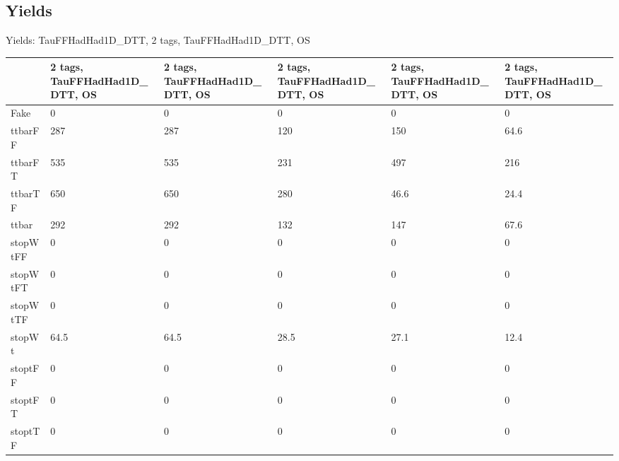 
\subsection{Yields}

\begin{frame}{Yields: TauFFHadHad1D\_DTT, 2 tags, TauFFHadHad1D\_DTT, OS}
\begin{center}
  \begin{tabular}{l| >{\centering\let\newline\\\arraybackslash\hspace{0pt}}m{1.4cm}| >{\centering\let\newline\\\arraybackslash\hspace{0pt}}m{1.4cm}| >{\centering\let\newline\\\arraybackslash\hspace{0pt}}m{1.4cm}| >{\centering\let\newline\\\arraybackslash\hspace{0pt}}m{1.4cm}| >{\centering\let\newline\\\arraybackslash\hspace{0pt}}m{1.4cm}}
    & 2 tags, TauFFHadHad1D\_DTT, OS & 2 tags, TauFFHadHad1D\_DTT, OS & 2 tags, TauFFHadHad1D\_DTT, OS & 2 tags, TauFFHadHad1D\_DTT, OS & 2 tags, TauFFHadHad1D\_DTT, OS \\
 \hline \hline
    Fake& 0 & 0 & 0 & 0 & 0 \\
 \hline
    ttbarFF& 287 & 287 & 120 & 150 & 64.6 \\
 \hline
    ttbarFT& 535 & 535 & 231 & 497 & 216 \\
 \hline
    ttbarTF& 650 & 650 & 280 & 46.6 & 24.4 \\
 \hline
    ttbar& 292 & 292 & 132 & 147 & 67.6 \\
 \hline
    stopWtFF& 0 & 0 & 0 & 0 & 0 \\
 \hline
    stopWtFT& 0 & 0 & 0 & 0 & 0 \\
 \hline
    stopWtTF& 0 & 0 & 0 & 0 & 0 \\
 \hline
    stopWt& 64.5 & 64.5 & 28.5 & 27.1 & 12.4 \\
 \hline
    stoptFF& 0 & 0 & 0 & 0 & 0 \\
 \hline
    stoptFT& 0 & 0 & 0 & 0 & 0 \\
 \hline
    stoptTF& 0 & 0 & 0 & 0 & 0 \\

\end{tabular}
\end{center}
\end{frame}
